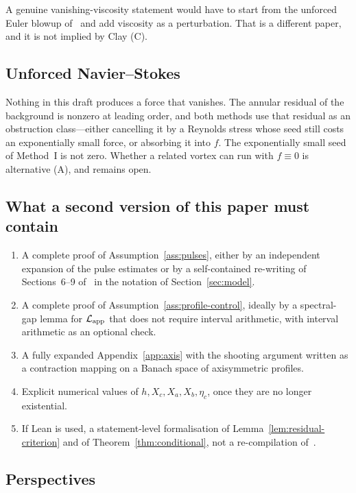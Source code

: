 A genuine vanishing-viscosity statement would have to start from the unforced {E}uler blowup of~\cite{openai2026euler} and add viscosity as a perturbation. That is a different paper, and it is not implied by {C}lay (C).

\subsection{Unforced {N}avier--{S}tokes}

Nothing in this draft produces a force that vanishes. The annular residual of the background is nonzero at leading order, and both methods use that residual as an obstruction class---either cancelling it by a {R}eynolds stress whose seed still costs an exponentially small force, or absorbing it into $f$. The exponentially small seed of Method~I is not zero. Whether a related vortex can run with $f\equiv 0$ is alternative (A), and remains open.

\subsection{What a second version of this paper must contain}

\begin{enumerate}[leftmargin=1.2em]
\item A complete proof of Assumption~\ref{ass:pulses}, either by an independent expansion of the pulse estimates or by a self-contained re-writing of Sections~6--9 of~\cite{openai2026ns} in the notation of Section~\ref{sec:model}.
\item A complete proof of Assumption~\ref{ass:profile-control}, ideally by a spectral-gap lemma for $\mathcal L_{\mathrm{app}}$ that does not require interval arithmetic, with interval arithmetic as an optional check.
\item A fully expanded Appendix~\ref{app:axis} with the shooting argument written as a contraction mapping on a Banach space of axisymmetric profiles.
\item Explicit numerical values of $h,X_c,X_a,X_b,\eta_c$, once they are no longer existential.
\item If {L}ean is used, a statement-level formalisation of Lemma~\ref{lem:residual-criterion} and of Theorem~\ref{thm:conditional}, not a re-compilation of~\cite{openai2026ns}.
\end{enumerate}

\subsection{Perspectives}

